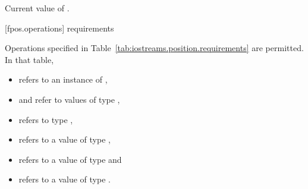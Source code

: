 \begin{itemdescr}
\pnum
\returns
Current value of .
\end{itemdescr}

[fpos.operations]{ requirements}

\pnum
{}%
%
Operations specified in Table~\ref{tab:iostreams.position.requirements} are permitted.
In that table,
\begin{itemize}
\item {} refers to an instance of ,
\item {} and  refer to values of type ,
\item {} refers to type ,
\item {} refers to a value of type ,
\item {} refers to a value of type  and
\item {} refers to a value of type .
\end{itemize}

